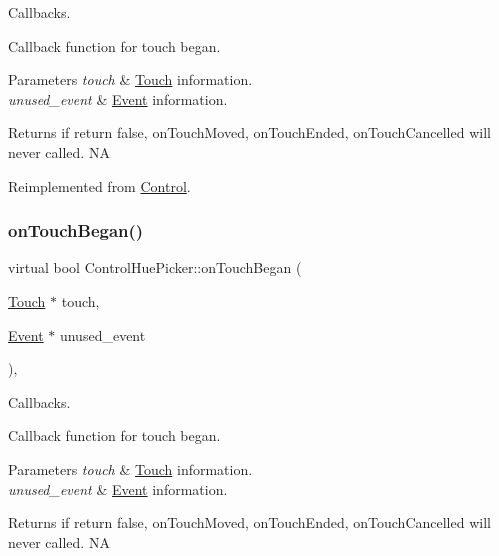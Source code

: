 Callbacks. 

Callback function for touch began.


\begin{DoxyParams}{Parameters}
{\em touch} & \hyperlink{classTouch}{Touch} information. \\
\hline
{\em unused\+\_\+event} & \hyperlink{classEvent}{Event} information. \\
\hline
\end{DoxyParams}
\begin{DoxyReturn}{Returns}
if return false, on\+Touch\+Moved, on\+Touch\+Ended, on\+Touch\+Cancelled will never called.  NA 
\end{DoxyReturn}


Reimplemented from \hyperlink{classControl_a0cf2e20cea5b57b263e965be4a19ab52}{Control}.

\mbox{\label{classControlHuePicker_af178753e94f91d15e613bf0c6387af5b}} 
\subsubsection{\texorpdfstring{on\+Touch\+Began()}{onTouchBegan()}\hspace{0.1cm}{\footnotesize\ttfamily [2/2]}}
{\footnotesize\ttfamily virtual bool Control\+Hue\+Picker\+::on\+Touch\+Began (\begin{DoxyParamCaption}\item[{\hyperlink{classTouch}{Touch} $\ast$}]{touch,  }\item[{\hyperlink{classEvent}{Event} $\ast$}]{unused\+\_\+event }\end{DoxyParamCaption})\hspace{0.3cm}{\ttfamily [override]}, {\ttfamily [virtual]}}



Callbacks. 

Callback function for touch began.


\begin{DoxyParams}{Parameters}
{\em touch} & \hyperlink{classTouch}{Touch} information. \\
\hline
{\em unused\+\_\+event} & \hyperlink{classEvent}{Event} information. \\
\hline
\end{DoxyParams}
\begin{DoxyReturn}{Returns}
if return false, on\+Touch\+Moved, on\+Touch\+Ended, on\+Touch\+Cancelled will never called.  NA 
\end{DoxyReturn}


